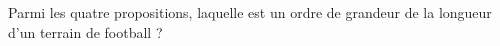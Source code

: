 
Parmi les quatre propositions, laquelle est un ordre de grandeur de la longueur d'un terrain de football ?

\smallskip
{}
